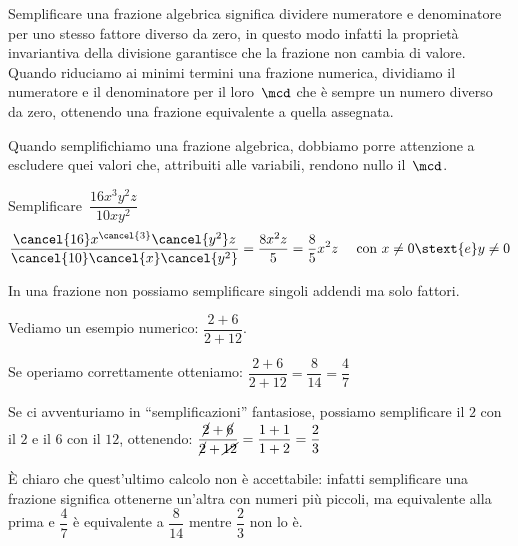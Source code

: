 Semplificare una frazione algebrica significa dividere numeratore e 
denominatore per uno stesso fattore diverso da zero, in questo modo infatti 
la proprietà invariantiva della divisione garantisce che la frazione non 
cambia di valore.
Quando riduciamo ai minimi termini una frazione numerica, dividiamo il 
numeratore e il denominatore per il loro~\(\mcd\) che è sempre un numero
diverso da zero, ottenendo una frazione equivalente a quella assegnata.

Quando semplifichiamo una frazione algebrica, dobbiamo 
porre attenzione a escludere quei valori che, attribuiti alle variabili, 
rendono nullo il~\(\mcd\).

\begin{esempio}{}{}
Semplificare~\(\dfrac{16x^{3}y^{2}z}{10xy^{2}}\)
\[%
\dfrac{\cancel{16}x^{\cancel{3}}\cancel{y^{2}}z}
      {\cancel{10}\cancel{x}\cancel{y^{2}}}=
\dfrac{8x^{2}z}{5}=\dfrac{8}{5}x^{2}z
\quad \text{ con } x \ne 0 \stext{e} y \ne 0
\]
\end{esempio}

\begin{osservazione}{}{} 
In una frazione non possiamo semplificare singoli 
addendi ma solo fattori.
\end{osservazione}

Vediamo un esempio numerico: \quad \(\dfrac{2+6}{2+12}\). 

Se operiamo correttamente otteniamo: \quad
\(\dfrac{2+6}{2+12}=\dfrac{8}{14}=\dfrac{4}{7}\)

Se ci avventuriamo in ``semplificazioni'' fantasiose, possiamo 
semplificare il \(2\) con il \(2\) e il \(6\) con il 
\(12\), ottenendo: \quad
\(\dfrac{\cancel{2} +\cancel{6}}{\cancel{2} +\cancel{12}}=
\dfrac{1+1}{1+2}=\dfrac{2}{3}\)

È chiaro che quest'ultimo calcolo non è accettabile: infatti semplificare una 
frazione significa ottenerne un'altra con numeri più piccoli, ma equivalente 
alla prima e \(\dfrac{4}{7}\) è equivalente a \(\dfrac{8}{14}\) mentre 
\(\dfrac{2}{3}\) non lo è.


